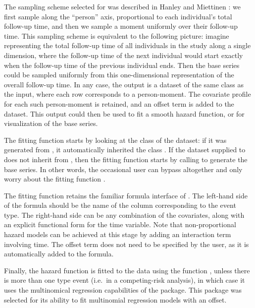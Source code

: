 \documentclass[article]{jss}
\begin{document}
The sampling scheme selected for  was described in
Hanley and Miettinen \citeyearpar{hanley2009fitting}: we first sample
along the ``person'' axis, proportional to each individual's total
follow-up time, and then we sample a moment uniformly over their
follow-up time. This sampling scheme is equivalent to the following
picture: imagine representing the total follow-up time of all
individuals in the study along a single dimension, where the follow-up
time of the next individual would start exactly when the follow-up time
of the previous individual ends. Then the base series could be sampled
uniformly from this one-dimensional representation of the overall
follow-up time. In any case, the output is a dataset of the same class
as the input, where each row corresponds to a person-moment. The
covariate profile for each such person-moment is retained, and an offset
term is added to the dataset. This output could then be used to fit a
smooth hazard function, or for visualization of the base series.

The fitting function  starts by looking at the
class of the dataset: if it was generated from , it
automatically inherited the class . If the dataset supplied
to  does not inherit from , then the
fitting function starts by calling  to generate the
base series. In other words, the occasional user can bypass
 altogether and only worry about the fitting
function .

The fitting function retains the familiar formula interface of
. The left-hand side of the formula should be the name of the
column corresponding to the event type. The right-hand side can be any
combination of the covariates, along with an explicit functional form
for the time variable. Note that non-proportional hazard models can be
achieved at this stage by adding an interaction term involving time. The
offset term does not need to be specified by the user, as it is
automatically added to the formula.

Finally, the hazard function is fitted to the data using the function
, unless there is more than one type event (i.e.~in a
competing-risk analysis), in which case it uses the multinomical
regression capabilities of the  package. This package was
selected for its ability to fit multinomial regression models with an
offset.
\end{document}

